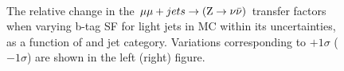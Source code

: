 \begin{figure}[!h]
  \centering
   ~~
  \\

  \caption{\label{fig:tfSyst_bsfl_mumuToZinv} The relative change in
  the $\mu\mu + jets \rightarrow ({\text Z} \rightarrow \nu\bar{\nu})$ transfer
  factors when varying b-tag SF for light jets in MC within its uncertainties, as a function of \scalht and jet category. 
  Variations corresponding to $+1\sigma$ ($-1\sigma$) are shown in the left (right) figure. 
  }
\end{figure}

